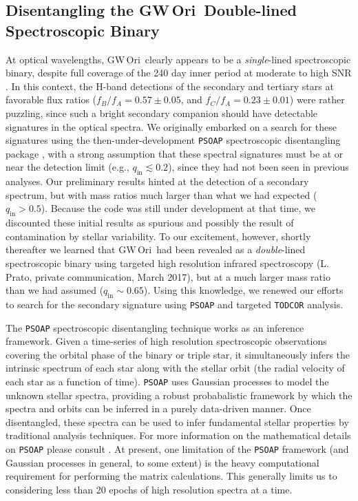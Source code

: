 \documentclass[twocolumn]{aastex61}
\newcommand{\gw}{GW\,Ori}
\begin{document}
\subsection{Disentangling the \gw\ Double-lined Spectroscopic Binary}
At optical wavelengths, \gw\ clearly appears to be a \emph{single}-lined spectroscopic binary, despite full coverage of the 240 day inner period at moderate to high SNR \citep{mathieu91,fang14}. In this context, the \citet{berger11} H-band detections of the secondary and tertiary stars at favorable flux ratios ($f_B / f_A = 0.57 \pm 0.05$, and $f_C / f_A = 0.23 \pm 0.01$) were rather puzzling, since such a bright secondary companion should have detectable signatures in the optical spectra. We originally embarked on a search for these signatures using the then-under-development \texttt{PSOAP} spectroscopic disentangling package \citep{czekala17}, with a strong assumption that these spectral signatures must be at or near the detection limit (e.g., $q_\mathrm{in} \lesssim 0.2$), since they had not been seen in previous analyses. Our preliminary results hinted at the detection of a secondary spectrum, but with mass ratios much larger than what we had expected ($q_\mathrm{in} > 0.5$). Because the code was still under development at that time, we discounted these initial results as spurious and possibly the result of contamination by stellar variability.
To our excitement, however, shortly thereafter we learned that \gw\ had been revealed as a \emph{double}-lined spectroscopic binary using targeted high resolution infrared spectroscopy (L. Prato, private communication, March 2017), but at a much larger mass ratio than we had assumed ($q_\mathrm{in} \sim 0.65$). Using this knowledge, we renewed our efforts to search for the secondary signature using \texttt{PSOAP} and targeted \texttt{TODCOR} analysis.


The \texttt{PSOAP} spectroscopic disentangling technique works as an inference framework. Given a time-series of high resolution spectroscopic observations covering the orbital phase of the binary or triple star, it simultaneously infers the intrinsic spectrum of each star along with the stellar orbit (the radial velocity of each star as a function of time). \texttt{PSOAP} uses Gaussian processes to model the unknown stellar spectra, providing a robust probabalistic framework by which the spectra and orbits can be inferred in a purely data-driven manner. Once disentangled, these spectra can be used to infer fundamental stellar properties by traditional analysis techniques. For more information on the mathematical details on \texttt{PSOAP} please consult \citet{czekala17}. At present, one limitation of the \texttt{PSOAP} framework (and Gaussian processes in general, to some extent) is the heavy computational requirement for performing the matrix calculations. This generally limits us to considering less than 20 epochs of high resolution spectra at a time.
\end{document}

